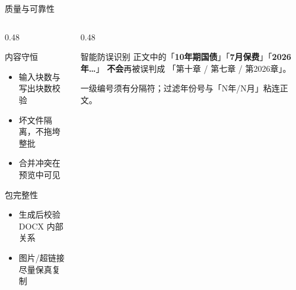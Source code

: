 \documentclass[aspectratio=169,10pt,UTF8]{ctexbeamer}
\begin{document}
\begin{frame}{质量与可靠性}
  \begin{columns}[T]
    \begin{column}{0.48\textwidth}
      \begin{block}{内容守恒}
        \begin{itemize}
          \item 输入块数与写出块数校验
          \item 坏文件隔离，不拖垮整批
          \item 合并冲突在预览中可见
        \end{itemize}
      \end{block}
      \vspace{0.5em}
      \begin{block}{包完整性}
        \begin{itemize}
          \item 生成后校验 DOCX 内部关系
          \item 图片/超链接尽量保真复制
        \end{itemize}
      \end{block}
    \end{column}
    \begin{column}{0.48\textwidth}
      \begin{alertblock}{智能防误识别}
        正文中的「\textbf{10年期国债}」「\textbf{7月保费}」「\textbf{2026年…}」
        \textbf{不会}再被误判成
        「第十章 / 第七章 / 第2026章」。
        \vspace{0.4em}

        {\small 一级编号须有分隔符；过滤年份号与「N年/N月」粘连正文。}
      \end{alertblock}
    \end{column}
  \end{columns}
\end{frame}
\end{document}

